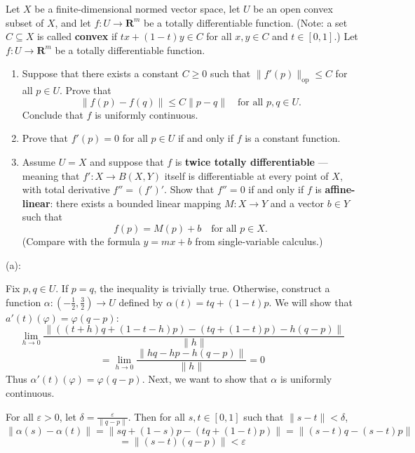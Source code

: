 \documentclass{article}
\newcommand{\R}{\mathbf{R}}
\theoremstyle{plain} %
\numberwithin{thm}{section} %
\theoremstyle{definition}
\begin{document}
    \pagebreak
    \begin{question}{25}
        Let $X$ be a finite-dimensional normed vector space, let $U$ be an open convex subset of $X$, and let $f:U\rightarrow \R^m$ be a totally differentiable function. (Note: a set $C\subseteq X$ is called \textbf{convex} if $tx+(1-t)y\in C$ for all $x,y\in C$ and $t\in [0,1]$.) Let $f:U\rightarrow \R^m$ be a totally differentiable function.

    \begin{enumerate}[label=(\alph*)]
        \item Suppose that there exists a constant $C\geq 0$ such that $\|f'(p)\|_{\mathrm{op}}\leq C$ for all $p\in U$. Prove that
            \[ \|f(p)-f(q)\| \leq C\|p-q\| \quad \text{for all $p,q\in U$.}  \]
        Conclude that $f$ is uniformly continuous.
        
        \item Prove that $f'(p)=0$ for all $p\in U$ if and only if $f$ is a constant function.

        \item Assume $U=X$ and suppose that $f$ is \textbf{twice totally differentiable} --- meaning that $f':X\rightarrow B(X,Y)$ itself is differentiable at every point of $X$, with total derivative $f''=(f')'$. Show that $f''=0$ if and only if $f$ is \textbf{affine-linear}: there exists a bounded linear mapping $M:X\rightarrow Y$ and a vector $b\in Y$ such that
            \[ f(p) = M(p) + b \quad \text{for all $p\in X$.} \]
        (Compare with the formula $y=mx+b$ from single-variable calculus.)
    \end{enumerate}
    \tcblower
    (a):

    Fix \(p,q \in U\). If \(p = q\), the inequality is trivially true. Otherwise, construct a function \(\alpha : (-\frac{1}{2}, \frac{3}{2}) \to U\) defined by \(\alpha (t) = tq + (1-t)p\). We will show that \(a'(t)(\varphi) = \varphi (q-p)\):
    \[
        \lim_{h \to 0} \frac{\|((t+h)q + (1-t-h)p) - (tq + (1-t)p) - h(q-p)\|}{\|h\|}
    \]
    \[
        = \lim_{h \to 0} \frac{\|hq -hp - h(q-p)\|}{\|h\|} = 0
    \]
    Thus \(\alpha '(t)(\varphi) = \varphi (q-p)\). Next, we want to show that \(\alpha\) is uniformly continuous.

    For all \(\varepsilon > 0\), let \(\delta = \frac{\varepsilon}{\|q-p\|}\). Then for all \(s,t \in [0,1]\) such that \(\|s-t\| < \delta \),
    \[
        \| \alpha (s) - \alpha (t) \| = \|s q + (1-s)p - (tq + (1-t)p) \| = \|(s-t)q - (s-t)p\|
    \]
    \[
        = \|(s-t)(q-p)\| < \varepsilon
    \]


\end{question}
\end{document}
